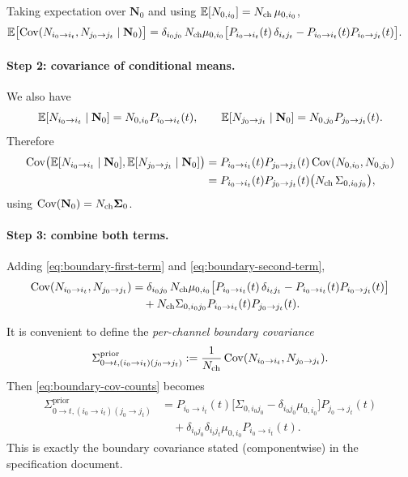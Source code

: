 \documentclass[11pt]{article}
\begin{document}
Taking expectation over \(\mathbf{N}_0\) and using
\(\mathbb{E}[N_{0,i_0}] = N_{\text{ch}}\,\mu_{0,i_0}\),
\begin{align}
  \mathbb{E}\bigl[
    \operatorname{Cov}(N_{i_0\to i_t}, N_{j_0\to j_t}\mid \mathbf{N}_0)
  \bigr]
  &=
  \delta_{i_0 j_0}\,
  N_{\text{ch}}\mu_{0,i_0}
  \bigl[
    P_{i_0\to i_t}(t)\,\delta_{i_t j_t}
    - P_{i_0\to i_t}(t)P_{i_0\to j_t}(t)
  \bigr].
  \label{eq:boundary-first-term}
\end{align}

\paragraph{Step 2: covariance of conditional means.}

We also have
\[
  \mathbb{E}[N_{i_0\to i_t}\mid \mathbf{N}_0]
  = N_{0,i_0}P_{i_0\to i_t}(t),
  \qquad
  \mathbb{E}[N_{j_0\to j_t}\mid \mathbf{N}_0]
  = N_{0,j_0}P_{j_0\to j_t}(t).
\]
Therefore
\begin{align}
  \operatorname{Cov}\bigl(
    \mathbb{E}[N_{i_0\to i_t}\mid \mathbf{N}_0],
    \mathbb{E}[N_{j_0\to j_t}\mid \mathbf{N}_0]
  \bigr)
  &=
  P_{i_0\to i_t}(t)
  P_{j_0\to j_t}(t)
  \operatorname{Cov}(N_{0,i_0},N_{0,j_0})
  \nonumber\\
  &=
  P_{i_0\to i_t}(t)
  P_{j_0\to j_t}(t)
  \bigl( N_{\text{ch}}\,\Sigma_{0,i_0 j_0}\bigr),
  \label{eq:boundary-second-term}
\end{align}
using \(\operatorname{Cov}(\mathbf{N}_0) = N_{\text{ch}}\boldsymbol{\Sigma}_0\).

\paragraph{Step 3: combine both terms.}

Adding \eqref{eq:boundary-first-term} and \eqref{eq:boundary-second-term},
\begin{align}
  \operatorname{Cov}(N_{i_0\to i_t}, N_{j_0\to j_t})
  &=
  \delta_{i_0 j_0}\,
  N_{\text{ch}}\mu_{0,i_0}
  \bigl[
    P_{i_0\to i_t}(t)\,\delta_{i_t j_t}
    - P_{i_0\to i_t}(t)P_{i_0\to j_t}(t)
  \bigr]
  \nonumber\\
  &\quad
  +
  N_{\text{ch}}
  \Sigma_{0,i_0 j_0}
  P_{i_0\to i_t}(t)
  P_{j_0\to j_t}(t).
  \label{eq:boundary-cov-counts}
\end{align}

It is convenient to define the \emph{per-channel boundary covariance}
\[
  \Sigma^{\text{prior}}_{0\to t,(i_0\to i_t)(j_0\to j_t)}
  :=
  \frac{1}{N_{\text{ch}}}
  \operatorname{Cov}(N_{i_0\to i_t}, N_{j_0\to j_t}).
\]
Then \eqref{eq:boundary-cov-counts} becomes
\begin{align}
  \Sigma^{\text{prior}}_{0\to t,(i_0\to i_t)(j_0\to j_t)}
  &=
  P_{i_0\to i_t}(t)
  \bigl[
    \Sigma_{0,i_0 j_0}
    - \delta_{i_0 j_0}\mu_{0,i_0}
  \bigr]
  P_{j_0\to j_t}(t)
  \nonumber\\
  &\quad
  +
  \delta_{i_0 j_0}\delta_{i_t j_t}
  \mu_{0,i_0}P_{i_0\to i_t}(t).
  \label{eq:boundary-cov-final}
\end{align}
This is exactly the boundary covariance stated (componentwise) in the
specification document.
\end{document}
